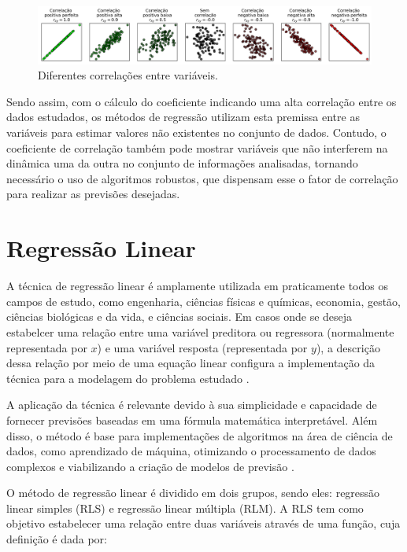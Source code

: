 \begin{figure}[H]
	\caption{\label{fig:correlacoes}Diferentes correlações entre variáveis.}
	\begin{center}
		\includegraphics[scale=0.4]{figuras/correlations.png}
	\end{center}
\end{figure}

Sendo assim, com o cálculo do coeficiente indicando uma alta correlação entre os dados estudados, os métodos de regressão utilizam esta premissa entre as variáveis para estimar valores não existentes no conjunto de dados. Contudo, o coeficiente de correlação também pode mostrar variáveis que não interferem na dinâmica uma da outra no conjunto de informações analisadas, tornando necessário o uso de algoritmos robustos, que dispensam esse o fator de correlação para realizar as previsões desejadas. 

\section{Regressão Linear}

A técnica de regressão linear é amplamente utilizada em praticamente todos os campos de estudo, como engenharia, ciências físicas e químicas, economia, gestão, ciências biológicas e da vida, e ciências sociais. Em casos onde se deseja estabelcer uma relação entre uma variável preditora ou regressora (normalmente representada por $x$) e uma variável resposta (representada por $y$), a descrição dessa relação por meio de uma equação linear configura a implementação da técnica para a modelagem do problema estudado \cite{montgomery2012}.  

A aplicação da técnica é relevante devido à sua simplicidade e capacidade de fornecer previsões baseadas em uma fórmula matemática interpretável. Além disso, o método é base para implementações de algoritmos na área de ciência de dados, como aprendizado de máquina, otimizando o processamento de dados complexos e viabilizando a criação de modelos de previsão \cite{aws2024}.

O método de regressão linear é dividido em dois grupos, sendo eles: regressão linear simples (RLS) e regressão linear múltipla (RLM). A RLS tem como objetivo estabelecer uma relação entre duas variáveis através de uma função, cuja definição é dada por:

